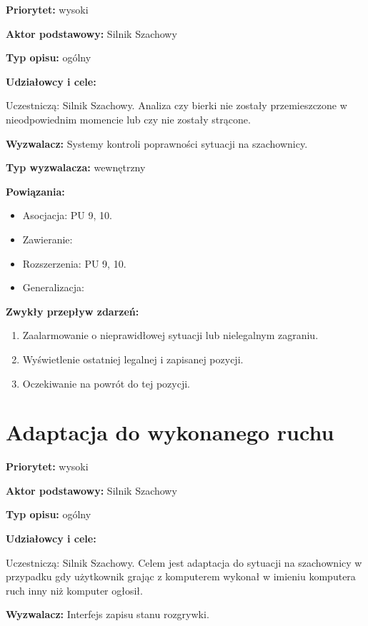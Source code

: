 \documentclass[12pt]{article}
\begin{document}
\textbf{Priorytet:} wysoki

\textbf{Aktor podstawowy:} Silnik Szachowy

\textbf{Typ opisu:} ogólny

\textbf{Udziałowcy i cele:} 

Uczestniczą: Silnik Szachowy. Analiza czy bierki nie zostały przemieszczone w nieodpowiednim momencie lub czy nie zostały strącone.

\textbf{Wyzwalacz:} Systemy kontroli poprawności sytuacji na szachownicy.

\textbf{Typ wyzwalacza:} wewnętrzny

\textbf{Powiązania:} 
	\begin{itemize}\item Asocjacja: PU 9, 10.
	\item Zawieranie: 
	\item Rozszerzenia: PU 9, 10.
	\item Generalizacja:
\end{itemize} 

\textbf{Zwykły przepływ zdarzeń:}  
\begin{enumerate}
\item Zaalarmowanie o nieprawidłowej sytuacji lub nielegalnym zagraniu.
\item Wyświetlenie ostatniej legalnej i zapisanej pozycji.
\item Oczekiwanie na powrót do tej pozycji.
\end{enumerate} 





\section{Adaptacja do wykonanego ruchu}

\textbf{Priorytet:} wysoki

\textbf{Aktor podstawowy:} Silnik Szachowy

\textbf{Typ opisu:} ogólny

\textbf{Udziałowcy i cele:} 

Uczestniczą: Silnik Szachowy. Celem jest adaptacja do sytuacji na szachownicy w przypadku gdy użytkownik grając z komputerem wykonał w imieniu komputera ruch inny niż komputer ogłosił.

\textbf{Wyzwalacz:}  Interfejs zapisu stanu rozgrywki.
\end{document}
